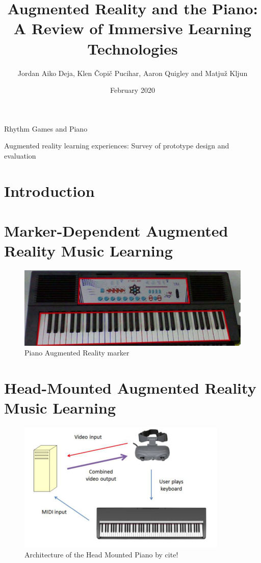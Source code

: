 \documentclass{article}
\title{Augmented Reality and the Piano: A Review of Immersive Learning Technologies}
\author{Jordan Aiko Deja, Klen Čopič Pucihar, Aaron Quigley and Matjuž Kljun}
\date{February 2020}
\begin{document}
\maketitle


\nocite{*}



Rhythm Games and Piano 

Augmented reality learning experiences: Survey of prototype design and evaluation

\section{Introduction}

\section{Marker-Dependent Augmented Reality Music Learning}

\begin{figure}
    \centering
    \includegraphics[width=15cm]{figures/pianomarker.png}
    \caption{Piano Augmented Reality marker}
    \label{fig:pianomarker}
\end{figure}



\section{Head-Mounted Augmented Reality Music Learning}

\begin{figure}
    \centering
    \includegraphics[width=10cm]{figures/headmountedpiano1.png}
    \caption{Architecture of the Head Mounted Piano by cite! }
    \label{fig:pianoheadmountedarch}
\end{figure}
\end{document}
